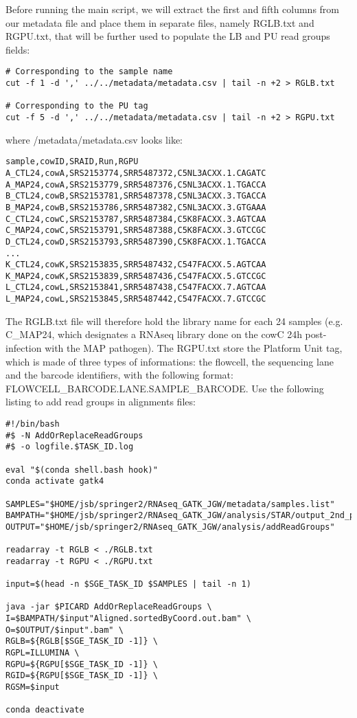 Before running the main script, we will extract the first and fifth columns from our metadata file and place them in separate files, namely RGLB.txt and  RGPU.txt, that will be further used to populate the LB and PU read groups fields:

\begin{verbatim}
# Corresponding to the sample name
cut -f 1 -d ',' ../../metadata/metadata.csv | tail -n +2 > RGLB.txt

# Corresponding to the PU tag 
cut -f 5 -d ',' ../../metadata/metadata.csv | tail -n +2 > RGPU.txt
\end{verbatim}

where /metadata/metadata.csv looks like:

\begin{verbatim}
sample,cowID,SRAID,Run,RGPU
A_CTL24,cowA,SRS2153774,SRR5487372,C5NL3ACXX.1.CAGATC
A_MAP24,cowA,SRS2153779,SRR5487376,C5NL3ACXX.1.TGACCA
B_CTL24,cowB,SRS2153781,SRR5487378,C5NL3ACXX.3.TGACCA
B_MAP24,cowB,SRS2153786,SRR5487382,C5NL3ACXX.3.GTGAAA
C_CTL24,cowC,SRS2153787,SRR5487384,C5K8FACXX.3.AGTCAA
C_MAP24,cowC,SRS2153791,SRR5487388,C5K8FACXX.3.GTCCGC
D_CTL24,cowD,SRS2153793,SRR5487390,C5K8FACXX.1.TGACCA
...
K_CTL24,cowK,SRS2153835,SRR5487432,C547FACXX.5.AGTCAA
K_MAP24,cowK,SRS2153839,SRR5487436,C547FACXX.5.GTCCGC
L_CTL24,cowL,SRS2153841,SRR5487438,C547FACXX.7.AGTCAA
L_MAP24,cowL,SRS2153845,SRR5487442,C547FACXX.7.GTCCGC
\end{verbatim}


The RGLB.txt file will therefore hold the library name for each 24 samples (e.g. C\_MAP24, which designates a RNAseq library done on the cowC 24h post-infection with the MAP pathogen). The RGPU.txt store the Platform Unit tag, which is made of three types of informations: the flowcell, the sequencing lane and the barcode identifiers, with the following format: {FLOWCELL\_BARCODE}.{LANE}.{SAMPLE\_BARCODE}. Use the following listing to add read groups in alignments files:


\begin{verbatim}
#!/bin/bash
#$ -N AddOrReplaceReadGroups
#$ -o logfile.$TASK_ID.log

eval "$(conda shell.bash hook)"
conda activate gatk4

SAMPLES="$HOME/jsb/springer2/RNAseq_GATK_JGW/metadata/samples.list"
BAMPATH="$HOME/jsb/springer2/RNAseq_GATK_JGW/analysis/STAR/output_2nd_pass"
OUTPUT="$HOME/jsb/springer2/RNAseq_GATK_JGW/analysis/addReadGroups"

readarray -t RGLB < ./RGLB.txt
readarray -t RGPU < ./RGPU.txt

input=$(head -n $SGE_TASK_ID $SAMPLES | tail -n 1)

java -jar $PICARD AddOrReplaceReadGroups \
I=$BAMPATH/$input"Aligned.sortedByCoord.out.bam" \
O=$OUTPUT/$input".bam" \
RGLB=${RGLB[$SGE_TASK_ID -1]} \
RGPL=ILLUMINA \
RGPU=${RGPU[$SGE_TASK_ID -1]} \
RGID=${RGPU[$SGE_TASK_ID -1]} \
RGSM=$input

conda deactivate
\end{verbatim}

